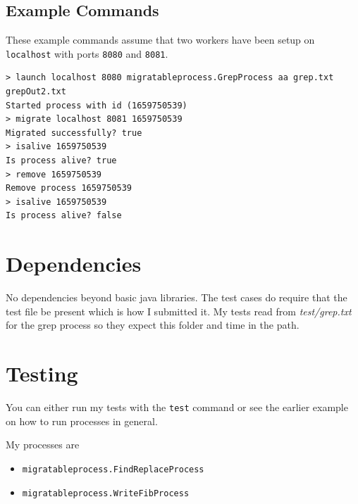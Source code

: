 \documentclass[12pt]{article}
\begin{document}
\subsection{Example Commands}
These example commands assume that two workers have been setup on \texttt{localhost} with ports \texttt{8080} and \texttt{8081}. 

\begin{verbatim}
> launch localhost 8080 migratableprocess.GrepProcess aa grep.txt grepOut2.txt
Started process with id (1659750539)
> migrate localhost 8081 1659750539
Migrated successfully? true
> isalive 1659750539
Is process alive? true
> remove 1659750539
Remove process 1659750539
> isalive 1659750539
Is process alive? false
\end{verbatim}


\section{Dependencies}

No dependencies beyond basic java libraries. The test cases do require that the test file be present which is how I submitted it. My tests read from \textit{test/grep.txt} for the grep process so they expect this folder and time in the path.


\section{Testing}

You can either run my tests with the \texttt{test} command or see the earlier example on how to run processes in general. 

My processes are
\begin{itemize}
\item \texttt{migratableprocess.FindReplaceProcess} 
\item \texttt{migratableprocess.WriteFibProcess}
\end{itemize}
\end{document}

